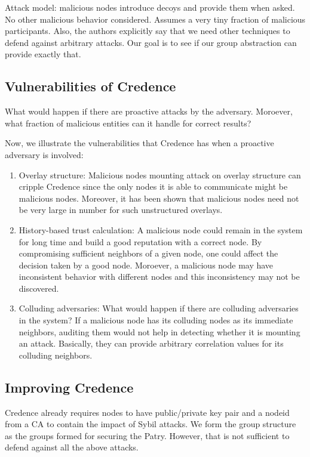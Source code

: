 Attack model: malicious nodes introduce decoys and provide them when asked. No other malicious behavior considered. Assumes a very tiny fraction of malicious participants. Also, the authors explicitly say that we need other techniques to defend against arbitrary attacks. Our goal is to see if our group abstraction can provide exactly that.

\subsection{Vulnerabilities of Credence}
What would happen if there are proactive attacks by the adversary. Moroever, what fraction of malicious entities can it handle for correct results?

Now, we illustrate the vulnerabilities that Credence has when a proactive adversary is involved:
\begin{enumerate}
\item{Overlay structure:} Malicious nodes mounting attack on overlay structure can cripple Credence since the only nodes it is able to communicate might be malicious nodes. Moreover, it has been shown that malicious nodes need not be very large in number for such unstructured overlays.
\item{History-based trust calculation:} A malicious node could remain in the system for long time and build a good reputation with a correct node. By compromising sufficient neighbors of a given node, one could affect the decision taken by a good node. Moroever, a malicious node may have inconsistent behavior with different nodes and this inconsistency may not be discovered.
\item{Colluding adversaries:} What would happen if there are colluding adversaries in the system? If a malicious node has its colluding nodes as its immediate neighbors, auditing them would not help in detecting whether it is mounting an attack. Basically, they can provide arbitrary correlation values for its colluding neighbors.
\end{enumerate}

\subsection{Improving Credence}
Credence already requires nodes to have public/private key pair and a nodeid from a CA to contain the impact of Sybil attacks. We form the group structure as the groups formed for securing the Patry. However, that is not sufficient to defend against all the above attacks. 


